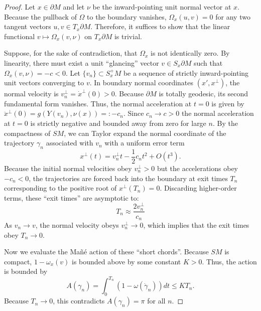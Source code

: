 \documentclass[12pt]{amsart}
\numberwithin{equation}{section}
\begin{document}
\begin{proof}
Let $x \in \partial M$ and let $\nu$ be the inward-pointing unit normal vector at $x$. Because the pullback of $\Omega$ to the boundary vanishes, $\Omega_x(u,v) = 0$
for any two tangent vectors $u,v \in T_x \partial M$. Therefore, it suffices to show that the linear functional $v \mapsto \Omega_x(v, \nu)$ on $T_x \partial M$ is trivial.

Suppose, for the sake of contradiction, that $\Omega_x$ is not identically zero. By linearity, there must exist a unit ``glancing'' vector $v \in S_x \partial M$ such that $\Omega_x(v, \nu) = -c < 0$. Let $\{v_n\} \subset S_x^+ M$ be a sequence of strictly inward-pointing unit vectors converging to $v$. In boundary normal coordinates $(x', x^\perp)$, the normal velocity is $v_n^\perp = \dot{x}^\perp(0) > 0$. Because $\partial M$ is totally geodesic, its second fundamental form vanishes. Thus, the normal acceleration at $t=0$ is given by $\ddot{x}^\perp(0) = g(Y(v_n),\nu(x)) =: -c_{n}$. Since $c_{n}\to c>0$ the normal acceleration at $t=0$ is strictly negative and bounded away from zero for large $n$.
By the compactness of $SM$, we can Taylor expand the normal coordinate of the trajectory $\gamma_n$ associated with $v_n$ with a uniform error term
\begin{equation}
    x^\perp(t) = v_n^\perp t - \frac{1}{2} c_{n} t^2 + O(t^3) .
\end{equation}
Because the initial normal velocities obey $v_n^\perp > 0$ but the accelerations obey $-c_{n}<0$,
the trajectories are forced back into the boundary at exit times $T_n$ corresponding to the positive root of $x^\perp(T_n) = 0$. Discarding higher-order terms, these ``exit times'' are asymptotic to:
\begin{equation}
    T_n \approx \frac{2v_n^\perp}{c_{n}}
\end{equation}
As $v_n \to v$, the normal velocity obeys $v_n^\perp \to 0$, which implies that the exit times obey $T_n \to 0$.

Now we evaluate the Ma\~n\'e action of these ``short chords''. Because $SM$ is compact, $1 - \omega_{x}(v)$ is bounded above by some constant $K > 0$. Thus, the action is bounded by
\begin{equation}
    A(\gamma_n) = \int_0^{T_n} (1 - \omega(\dot{\gamma}_n)) dt \le K T_n .
\end{equation}
Because $T_n \to 0$, this contradicts $A(\gamma_n) = \pi$ for all $n$.
\end{proof}
\end{document}
